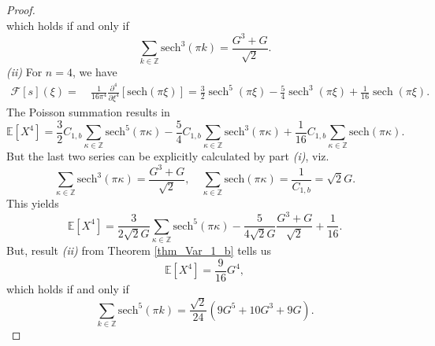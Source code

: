 \documentclass[12pt]{amsart}
\theoremstyle{definition}
\theoremstyle{remark}
\numberwithin{equation}{section}
\newcommand{\1}{\mathbbm{1}}
\begin{document}
\begin{proof}
$$$$
which holds if and only if
$$
\sum_{k \in \mathbb{Z}} \mathrm{sech}^3(\pi k) = \frac{G^3 + G}{\sqrt{2}}.
$$
\textit{(ii)} For $n=4$, we have 
\begin{align*}
\mathcal{F}[s](\xi) =&\ \frac{1}{16 \pi ^4} \frac{\partial^4}{\partial\xi^4} \left[ \mathrm{sech}(\pi \xi)\right] = \frac{3}{2} \operatorname{sech}^5(\pi \xi) - \frac{5}{4}\operatorname{sech}^3 (\pi \xi) + \frac{1}{16} \operatorname{sech}(\pi \xi).
\end{align*}
The Poisson summation results in
$$
\mathbb{E}\left[X^4\right] = \frac{3}{2} C_{1,b} \sum_{\kappa \in \mathbb{Z}} \mathrm{sech}^5(\pi \kappa) - \frac{5}{4} C_{1,b} \sum_{\kappa \in \mathbb{Z}} \mathrm{sech}^3(\pi \kappa) + \frac{1}{16} C_{1,b} \sum_{\kappa \in \mathbb{Z}} \mathrm{sech}(\pi \kappa).
$$
But the last two series can be explicitly calculated by part \textit{(i)}, viz.
$$
\sum_{\kappa \in \mathbb{Z}} \mathrm{sech}^3(\pi \kappa) = \frac{G^3 + G}{\sqrt{2}}, \quad \sum_{\kappa \in \mathbb{Z}} \mathrm{sech}(\pi \kappa) = \frac{1}{C_{1,b}} = \sqrt{2}G.
$$
This yields
$$
\mathbb{E}\left[X^4\right] = \frac{3}{2\sqrt{2}G} \sum_{\kappa \in \mathbb{Z}} \mathrm{sech}^5(\pi \kappa) - \frac{5}{4\sqrt{2}G} \frac{G^3 + G}{\sqrt{2}} + \frac{1}{16}.
$$
But, result \textit{(ii)} from Theorem \ref{thm_Var_1_b} tells us
$$
\mathbb{E}\left[X^4\right] = \frac{9}{16}G^4,
$$
which holds if and only if
$$
\sum_{k \in \mathbb{Z}} \mathrm{sech}^5(\pi k) = \frac{\sqrt{2}}{24}(9 G^5 + 10G^3+ 9G).
$$


\end{proof}
\end{document}
